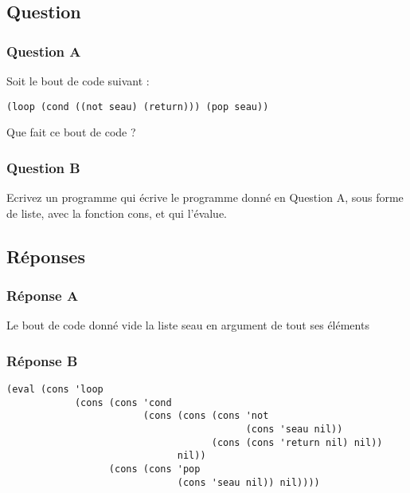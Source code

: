 \documentclass[a4paper, 11pt]{article}
\begin{document}
\subsection{Question}
\subsubsection{Question A}
Soit le bout de code suivant :
\begin{lstlisting}
(loop (cond ((not seau) (return))) (pop seau))
\end{lstlisting}
Que fait ce bout de code ?
\subsubsection{Question B}
Ecrivez un programme qui écrive le programme donné en Question A, sous forme de liste, avec la fonction cons, et qui l'évalue.
\subsection{Réponses}
\subsubsection{Réponse A}
Le bout de code donné vide la liste seau en argument de tout ses éléments
\subsubsection{Réponse B}
\begin{lstlisting}
(eval (cons 'loop
            (cons (cons 'cond
                        (cons (cons (cons 'not
                                          (cons 'seau nil))
                                    (cons (cons 'return nil) nil))
                              nil))
                  (cons (cons 'pop
                              (cons 'seau nil)) nil))))
\end{lstlisting}
%
\end{document}
